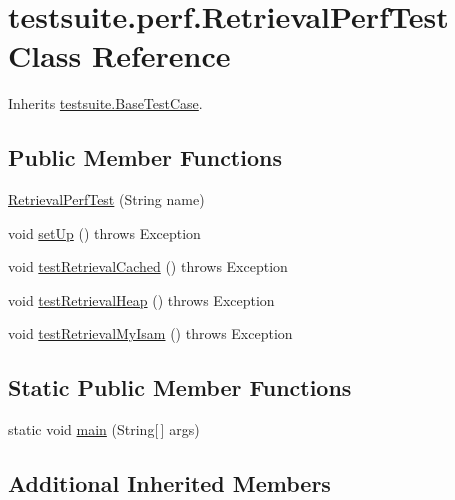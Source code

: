 \hypertarget{classtestsuite_1_1perf_1_1_retrieval_perf_test}{}\section{testsuite.\+perf.\+Retrieval\+Perf\+Test Class Reference}
\label{classtestsuite_1_1perf_1_1_retrieval_perf_test}


Inherits \mbox{\hyperlink{classtestsuite_1_1_base_test_case}{testsuite.\+Base\+Test\+Case}}.

\subsection*{Public Member Functions}
\begin{DoxyCompactItemize}
\item 
\mbox{\hyperlink{classtestsuite_1_1perf_1_1_retrieval_perf_test_abfe4d6c49777d60f2cb249cb5f72ef0d}{Retrieval\+Perf\+Test}} (String name)
\item 
void \mbox{\hyperlink{classtestsuite_1_1perf_1_1_retrieval_perf_test_aff556b7b6ac0eb46250902daf1153b3a}{set\+Up}} ()  throws Exception 
\item 
void \mbox{\hyperlink{classtestsuite_1_1perf_1_1_retrieval_perf_test_af70613a47b26a32ea960835584da6d3a}{test\+Retrieval\+Cached}} ()  throws Exception 
\item 
void \mbox{\hyperlink{classtestsuite_1_1perf_1_1_retrieval_perf_test_af8c1a7c2f684c76b0e310bf7a97c3258}{test\+Retrieval\+Heap}} ()  throws Exception 
\item 
void \mbox{\hyperlink{classtestsuite_1_1perf_1_1_retrieval_perf_test_a7228eef6533f6ff301ae53d044e25f9e}{test\+Retrieval\+My\+Isam}} ()  throws Exception 
\end{DoxyCompactItemize}
\subsection*{Static Public Member Functions}
\begin{DoxyCompactItemize}
\item 
static void \mbox{\hyperlink{classtestsuite_1_1perf_1_1_retrieval_perf_test_afb26b964fc63ebfdc34ed46e47a88ca5}{main}} (String\mbox{[}$\,$\mbox{]} args)
\end{DoxyCompactItemize}
\subsection*{Additional Inherited Members}


